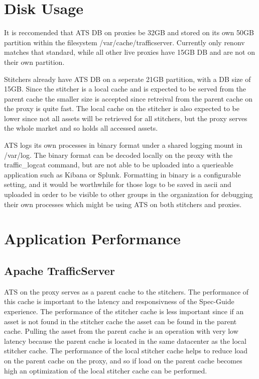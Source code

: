 \documentclass{article}
\begin{document}
\section{Disk Usage}
\label{SECTION-Disk}

It is reccomended that ATS DB on proxies be 32GB and stored on its own 50GB partition within the filesystem /var/cache/trafficserver. Currently only renonv matches that standard, while all other live proxies have 15GB DB and are not on their own partition. 

Stitchers already have ATS DB on a seperate 21GB partition, with a DB size of 15GB. Since the stitcher is a local cache and is expected to be served from the parent cache the smaller size is accepted since retreival from the parent cache on the proxy is quite fast. The local cache on the stitcher is also expected to be lower since not all assets will be retrieved for all stitchers, but the proxy serves the whole market and so holds all accessed assets. 

ATS logs its own processes in binary format under a shared logging mount in /var/log. The binary format can be decoded locally on the proxy with the traffic\_logcat command, but are not able to be uploaded into a querieable application such as Kibana or Splunk. Formatting in binary is a configurable setting, and it would be worthwhile for those logs to be saved in ascii and uploaded in order to be visible to other groups in the organization for debugging their own processes which might be using ATS on both stitchers and proxies. 



\section{Application Performance}
\label{SECTION-APPPerf}

\subsection{Apache TrafficServer}
\label{SECTION-ATS}

ATS on the proxy serves as a parent cache to the stitchers. The performance of this cache is important to the latency and responsivness of the Spec-Guide experience. The performance of the stitcher cache is less important since if an asset is not found in the stitcher cache the asset can be found in the parent cache. Pulling the asset from the parent cache is an operation with very low latency because the parent cache is located in the same datacenter as the local stitcher cache. The performance of the local stitcher cache helps to reduce load on the parent cache on the proxy, and so if load on the parent cache becomes high an optimization of the local stitcher cache can be performed. 
\end{document}
